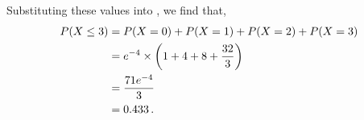\begin{subquestions}
Substituting these values into , we find that,
\begin{align}
	P(X \leq 3) & = P(X=0)+P(X=1)+P(X=2)+P(X=3) \nonumber \\
	            & = e^{-4} \times \left(1+4+8+\frac{32}{3}\right) \nonumber \\
	            & = \frac{71e^{-4}}{3} \nonumber \\
	            & = 0.433 \,.
\end{align}


\end{subquestions}